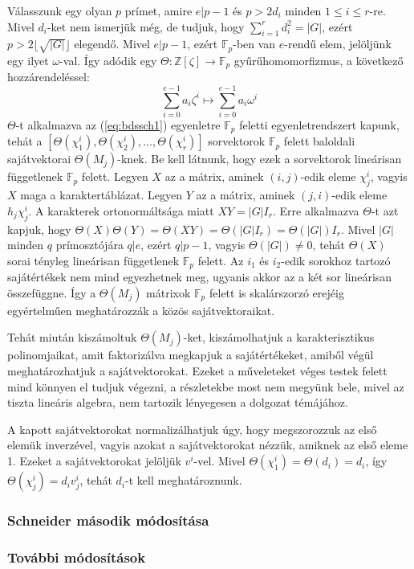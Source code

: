 Válasszunk egy olyan $p$ prímet, amire $e|p-1$ és $p > 2 d_i$ minden $1\le i\le r$-re. Mivel $d_i$-ket nem ismerjük még, de tudjuk, hogy 
$\sum_{i=1}^r d_i^2 = |G|$, ezért $p > 2\lfloor \sqrt{|G|} \rfloor$ elegendő. Mivel $e|p-1$, ezért $\mathbb{F}_p$-ben van $e$-rendű elem, jelöljünk
egy ilyet $\omega$-val. Így adódik egy $\Theta : \mathbb{Z}[\zeta] \to \mathbb{F}_p$ gyűrűhomomorfizmus, a következő hozzárendeléssel:
$$\sum_{i=0}^{e-1} a_i \zeta^i \mapsto \sum_{i=0}^{e-1} a_i \omega^i$$
$\Theta$-t alkalmazva az (\ref{eq:bdssch1}) egyenletre $\mathbb{F}_p$ feletti egyenletrendszert kapunk,
tehát a $[\Theta(\chi^i_1), \Theta(\chi^i_2), \dots, \Theta(\chi^i_r)]$ sorvektorok $\mathbb{F}_p$ felett baloldali sajátvektorai $\Theta(M_j)$-knek.
Be kell látnunk, hogy ezek a sorvektorok lineárisan függetlenek $\mathbb{F}_p$ felett.
Legyen $X$ az a mátrix, aminek $(i, j)$-edik eleme $\chi^i_j$, vagyis $X$ maga a karaktertáblázat.
Legyen $Y$ az a mátrix, aminek $(j, i)$-edik eleme $h_j\chi^i_j$.
A karakterek ortonormáltsága miatt $XY=|G|I_r$.
Erre alkalmazva $\Theta$-t azt kapjuk, hogy $\Theta(X)\Theta(Y)=\Theta(XY)=\Theta(|G|I_r)=\Theta(|G|)I_r$.
Mivel $|G|$ minden $q$ prímosztójára $q|e$, ezért $q|p-1$, vagyis $\Theta(|G|)\ne 0$, tehát $\Theta(X)$ sorai tényleg lineárisan függetlenek $\mathbb{F}_p$ felett.
Az $i_1$ és $i_2$-edik sorokhoz tartozó sajátértékek nem mind egyezhetnek meg, ugyanis akkor az a két sor lineárisan összefüggne.
Így a $\Theta(M_j)$ mátrixok $\mathbb{F}_p$ felett is skalárszorzó erejéig egyértelműen meghatározzák a közös sajátvektoraikat.

Tehát miután kiszámoltuk $\Theta(M_j)$-ket, kiszámolhatjuk a karakterisztikus polinomjaikat, amit faktorizálva megkapjuk a sajátértékeket, amiből végül meghatározhatjuk a sajátvektorokat.
Ezeket a műveleteket véges testek felett mind könnyen el tudjuk végezni, a részletekbe most nem megyünk bele, mivel az tiszta lineáris algebra, nem tartozik lényegesen a dolgozat témájához.

A kapott sajátvektorokat normalizálhatjuk úgy, hogy megszorozzuk az első elemük inverzével, vagyis azokat a sajátvektorokat nézzük, amiknek az első eleme 1.
Ezeket a sajátvektorokat jelöljük $v^i$-vel. Mivel $\Theta(\chi^i_1)=\Theta(d_i)=d_i$, így $\Theta(\chi^i_j)=d_i v^i_j$, tehát $d_i$-t kell meghatároznunk.


\subsubsection{Schneider második módosítása}
\label{subsubsec:bdssch2}

\subsubsection{További módosítások}
\label{subsubsec:bdstovabbi}
